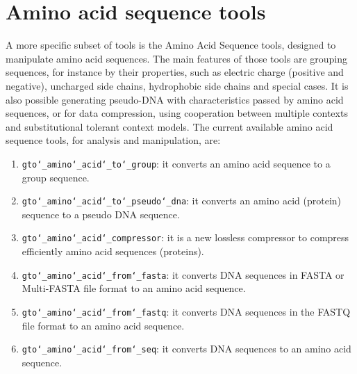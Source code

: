 \chapter{Amino acid sequence tools}
\label{seq}
A more specific subset of tools is the Amino Acid Sequence tools, designed to manipulate amino acid sequences. The main features of those tools are grouping sequences, for instance by their properties, such as electric charge (positive and negative), uncharged side chains, hydrophobic side chains and special cases. It is also possible generating pseudo-DNA with characteristics passed by amino acid sequences, or for data compression, using cooperation between multiple contexts and substitutional tolerant context models. The current available amino acid sequence tools, for analysis and manipulation, are:
\begin{enumerate}
	
\item \texttt{gto\char`_amino\char`_acid\char`_to\char`_group}: it converts an amino acid sequence to a group sequence.

\item \texttt{gto\char`_amino\char`_acid\char`_to\char`_pseudo\char`_dna}: it converts an amino acid (protein) sequence to a pseudo DNA sequence.

\item \texttt{gto\char`_amino\char`_acid\char`_compressor}: it is a new lossless compressor to compress efficiently amino acid sequences (proteins).

\item \texttt{gto\char`_amino\char`_acid\char`_from\char`_fasta}: it converts DNA sequences in FASTA or Multi-FASTA file format to an amino acid sequence.

\item \texttt{gto\char`_amino\char`_acid\char`_from\char`_fastq}: it converts DNA sequences in the FASTQ file format to an amino acid sequence.

\item \texttt{gto\char`_amino\char`_acid\char`_from\char`_seq}: it converts DNA sequences to an amino acid sequence.


\end{enumerate}







%
